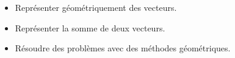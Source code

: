 \documentclass[12pt]{article}
\theoremstyle{break}
\begin{document}
%
%

\begin{savoir}{}{}
  \begin{itemize}[label=--]
    \item Représenter géométriquement des vecteurs.
    \item Représenter la somme de deux vecteurs.
    \item Résoudre des problèmes avec des méthodes géométriques.
  \end{itemize}
\end{savoir}

\vfill
\end{document}
